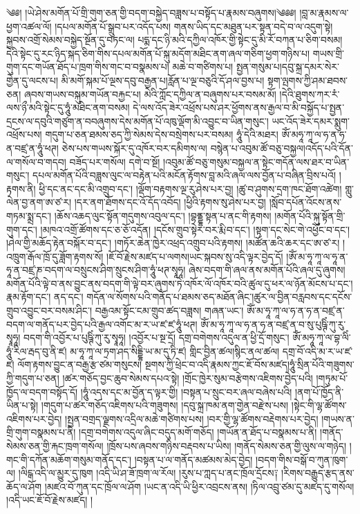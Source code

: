 \setcounter{footnote}{0} 
༄༅། །ཡེ་ཤེས་མགོན་པོ་གྲི་གུག་ཅན་གྱི་བདག་བསྐྱེད་བཟླས་པ་བསྟོད་པ་རྣམས་བཞུགས།༄༅༅། །བླ་མ་རྣམས་ལ་ཕྱག་འཚལ་ལོ། །དཔལ་མགོན་པོ་སྒྲུབ་པར་འདོད་པས། གནས་ཡིད་དང་མཐུན་པར་སྟན་བདེ་བ་ལ་འདུག་སྟེ། སྐྱབས་འགྲོ་སེམས་བསྐྱེད་སྔོན་དུ་བཏང་ལ། པདྨ་དང་ཉི་མའི་དཀྱིལ་འཁོར་གྱི་སྟེང་དུ་མི་རོ་བཀན་པ་ཅིག་བསམ། དེའི་སྟེང་དུ་རང་ཉིད་སྐད་ཅིག་གིས་དཔལ་མགོན་པོ་སྐུ་མདོག་མཐིང་ནག་ཞལ་གཅིག་ཕྱག་གཉིས་པ། གཡས་གྲི་གུག་དང་གཡོན་ཐོད་པ་ཁྲག་གིས་གང་བ་བསྣམས་པ། མཆེ་བ་གཙིགས་པ། སྤྱན་གསུམ་པ།དབུ་སྐྲ་དམར་སེར་གྱེན་དུ་ལངས་པ། མི་མགོ་སྐམ་པོ་ལྔས་དབུ་བརྒྱན་པ།རློན་པ་ལྔ་བཅུའི་དོ་ཤལ་བྱས་པ། སྟག་ལྤགས་ཀྱི་ཤམ་ཐབས་ཅན། ཞབས་གཡས་བསྐུམ་གཡོན་བརྐྱང་པ། མེའི་ཀློང་དཀྱིལ་ན་བཞུགས་པར་བསམ་མོ། །དེའི་ཐུགས་ཀར་རཾ་ལས་ཉྀ་མའི་སྟེང་དུ་ཧཱུཾ་མཐིང་ནག་བསམ། དེ་ལས་འོད་ཟེར་འཕྲོས་པས་ཤར་ཕྱོགས་ནས་རྒྱལ་བ་མི་བསྐྱོད་པ་སྤྱན་དྲངས་ལ་དབུའི་གཙུག་ན་བབཞུགས་དེས་མགོན་པོ་འཁུ་ལྡོག་མི་འབྱུང་བ་ཡིན་གསུང་། ཡང་འོད་ཟེར་དམར་སྨུག་འཕྲོས་པས། གདུག་པ་ཅན་ཐམས་ཅད་ཀྱི་སེམས་དེས་བསྲེགས་པར་བསམ། ཧཱུཾ་དེའི་མཐར། ཨོཾ་མཧཱ་ཀཱ་ལ་ཧ་ན་ཧ་ན་བཛྲ་ན་ཧཱུཾ་ཕཊ། ཅེས་པས་གཡས་སྐོར་དུ་འཁོར་བར་དམིགས་ལ། བསྙེན་པ་འབུམ་ཚོ་བཅུ་བསྐྱལ།འདོད་པའི་དོན་ལ་གསོལ་བ་གདབ། བཟོད་པར་གསོལ། དགེ་བ་སྔོ། །འབུམ་ཚོ་བཅུ་གསུམ་བསྐྱལ་ན་སྟེང་གདོན་ལས་ཐར་བ་ཡིན་གསུང་། དཔལ་མགོན་པོའི་བཟླས་ལུང་ལ་བརྟེན་པའི་མངོན་རྟོགས་བླ་མའི་ཞལ་ལས་བྱོན་པ་བཞིན་བྲིས་པའོ། །རྟགས་ནི། ཕྱི་དང་ནང་དང་མི་འགྲུབ་དང་། །ལྡོག་བརྟགས་ལྔ་རུ་ཤེས་པར་བྱ། །ཚུ་བ་ཤུགས་དྲག་ཁང་ཐོག་འཚེག། གླུ་ལེན་བྱ་ནག་ཨ་ཙ་ར། །དར་ནག་ཐོགས་དང་འོ་དོད་འབོད། །ཕྱིའི་རྟགས་སུ་ཤེས་པར་བྱ། །སློབ་དཔོན་འོངས་ནས་གཏམ་སྨྲ་དང་། །ཆོས་འཆད་ལུང་སྟོན་གདུགས་འབུལ་དང་། །བྷནྡྷ་སྟན་པ་ནང་གི་རྟགས། །མགོན་པོའི་སྐུ་སྟོན་གྲི་གུག་དང་། །མཁའ་འགྲོ་ཚོགས་དང་ཅ་ཅོ་འདོན། །དངོས་གྲུབ་སྟེར་བར་རྨི་བ་དང་། །སྟག་དང་སེང་གེ་འཕྱོང་བ་དང་། །ཤེལ་གྱི་མཆོད་རྟེན་བསྐོར་བ་དང་། །གཏོར་ཆེན་ཁྱེར་འཕྲད་འགྲུབ་པའི་རྟགས། །མཚོན་ཆའི་ཆར་དང་ཨ་ཙ་ར། །འཁྲུག་རྒོལ་ཁྲོ་དུ་ཟློག་རྟགས་སོ། །ཇོ་བོ་རྗེས་མཛད་པ་ལགས།ཡང་སྐབས་སུ་འདི་ལྟར་བྱེད་དོ། །ཨོཾ་མ་ཧཱ་ཀཱ་ལ་ཧཱ་ན་ཧཱ་ན་བཛྲ་ཎ་བདག་ལ་བསྲུངས་ཤིག་སྲུངས་ཤིག་ཧཱུཾ་ཕཊ་སྭཱཧཱ། ཞེས་བདག་གི་ཞལ་ནས་མགོན་པོའི་ཞལ་དུ་ཞུགས། མགོན་པོའི་ལྟེ་བ་ནས་བྱུང་ནས་བདག་གི་ལྟེ་བར་ཞུགས་ཏེ་འཁོར་ལོ་འཁོར་བའི་ཚུལ་དུ་ཕར་ལ་ཉོན་མོངས་པ་དང་། རྣམ་རྟོག་དང་། ནད་དང་། གདོན་ལ་སོགས་པའི་གནོད་པ་ཐམས་ཅད་མཐོན་ཞིང་།ཚུར་ལ་བྱིན་བརླབས་དང་དངོས་གྲུབ་འབྱུང་བར་བསམ་ཤིང་། བརྒྱའམ་སྟོང་ངམ་གྲུབ་ཚད་བཟླས། གཞན་ཡང་། ཨོཾ་མ་ཧཱ་ཀཱ་ལ་ཧ་ན་ཧ་ན་བཛྲ་ན་བདག་ལ་གནོད་པར་བྱེད་པའི་རྒྱལ་འགོང་མ་ར་ཡ་ཛ་ཛ་ཧཱུཾ་ཕཊ། ཨོཾ་མ་ཧཱ་ཀཱ་ལ་ཧ་ན་ཧ་ན་བཛྲ་ན་བ་སུ་པུཥྚིཾ་ཀུ་རུ་སྭཱཧཱ། བདག་གི་འབྱོར་པ་པུཥྚིཾ་ཀུ་རུ་སྭཱཧཱ། །འབྱོར་པ་སྔ་དྲོ། དགྲ་བགེགས་འདུལ་ན་ཕྱི་དྲོ་གསུང་། ཨོཾ་མཧཱ་ཀཱ་ལ་བྷ་ལིཾ་ཧཱུཾ་རིལ་རྦད་བུ་ནི་ཛ། མ་ཧཱ་ཀཱ་ལ་ཏྲག་ཤད་སིདྡྷི་ཡ་མ་དུ་ཏི་ཛ། གླིང་བྱིན་ཚལ།སྙིང་ནལ་ཚལ། དགྲ་བོ་འདི་མ་ར་ཡ་ཛ་ཛ། ལོག་རྟགས་བྱུང་ན་བརྒྱ་རྩ་ཙམ་གསུངས། སྔགས་ཀྱི་ཕྲེང་བ་འདི་རྣམས་ཀྱང་ཇོ་བོས་མཛད།ཧཱུཾ་སྲིན་པོའི་གཟུགས་ཀྱི་གདུག་པ་ཅན། །ཚར་གཅོད་བྱང་ཆུབ་སེམས་དཔའ་སྟེ། །གྲོང་ཁྱེར་སུམ་བརྩེགས་འཇིགས་བྱེད་པའི། །གཏུམ་པོ་ཁྱོད་ལ་བདག་བསྟོད་དོ། །ཧཱུཾ་འདས་དང་མ་བྱོན་ད་ལྟར་གྱི། །བསྟན་པ་སྲུང་བར་ཞལ་བཞེས་པའི། །ནག་པོ་ཁྱོད་ནི་ཡིན་པ་སྟེ། །གདུག་པ་ཚར་གཅོད་འཇིགས་པའི་གཟུགས། །དབུ་སྐྲ་ཁམ་ནག་གྱེན་བརྫེས་པས། །སྟེང་གི་ལྷ་ཚོགས་འཇིགས་པར་བྱེད། །སྤྱན་བགྲད་ལྗགས་འདྲིལ་མཆེ་གཙིགས་པས། །བར་གྱི་ལྷ་ཚོགས་བརྡེགས་པར་བྱེད། །གཡས་ན་གྲི་གུག་བསྣམས་པ་ནི། །དགྲ་བགེགས་འདུལ་ཞིང་བདུད་མགོ་གཅོད། །གཡོན་ན་ཐོད་པ་བསྣམས་པ་ནི། །གནོད་སེམས་ཅན་གྱི་རྐང་ཁྲག་གསོལ། །ཁྲོས་པས་ཞབས་གཉིས་བརྡབས་པ་ཡིས། །གནོད་སེམས་ཅན་གྱི་ལུས་ལ་གཉེད། །གང་གི་དཀོན་མཆོག་གསུམ་གནོད་དང་། །བསྟན་པ་ལ་གནོད་མཚམས་མེད་བྱེད། །བདག་གིས་བསྒོ་བ་ཀུན་ཁུག་ལ། །ལིངྒ་འདི་ལ་མྱུར་དུ་ཁུག །འདི་ཡི་ཤ་ཟོ་ཁྲག་ལ་རོལ། །རུས་པ་ཀླད་པ་ནང་ཁྲོལ་དྲོངས༑ །རིགས་བརྒྱུད་རྩད་ནས་ཆོད་ལ་ཤོག །མཛའ་བོ་ཀུན་དང་ཁྲོལ་ལ་ཤོག །ཡང་ན་འདི་ཡི་ཕྱིར་འབྲངས་ནས། །ཏིལ་འབྲུ་ཙམ་དུ་མཛད་དུ་གསོལ། །འདི་ཡང་ཇོ་བོ་རྗེས་མཛད། །